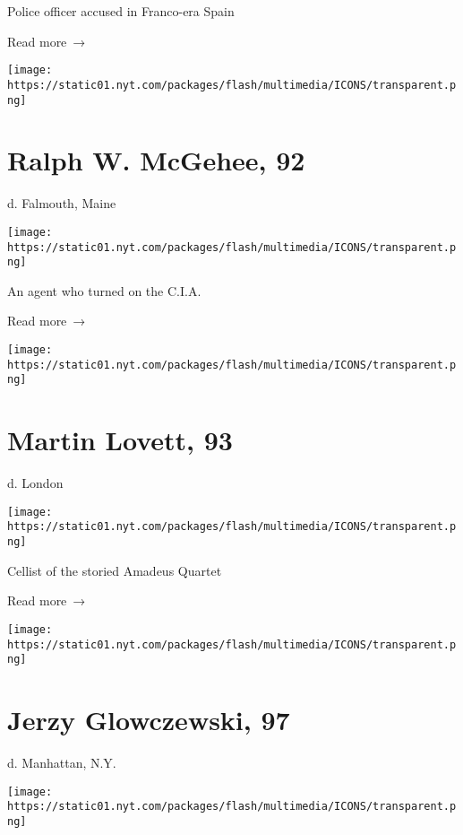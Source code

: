 Police officer accused in Franco-era Spain

 Read more~→

\href{https://www.nytimes.com/2020/05/14/us/ralph-w-mcgehee-virus-lost.html}{}

\texttt{[image: https://static01.nyt.com/packages/flash/multimedia/ICONS/transparent.png]}

\hypertarget{ralph-w-mcgehee-92}{%
\section{Ralph W. McGehee, 92}\label{ralph-w-mcgehee-92}}

d. Falmouth, Maine

\texttt{[image: https://static01.nyt.com/packages/flash/multimedia/ICONS/transparent.png]}

An agent who turned on the C.I.A.

 Read more~→

\href{https://www.nytimes.com/2020/05/14/obituaries/martin-lovett-dead-coronavirus.html}{}

\texttt{[image: https://static01.nyt.com/packages/flash/multimedia/ICONS/transparent.png]}

\hypertarget{martin-lovett-93}{%
\section{Martin Lovett, 93}\label{martin-lovett-93}}

d. London

\texttt{[image: https://static01.nyt.com/packages/flash/multimedia/ICONS/transparent.png]}

Cellist of the storied Amadeus Quartet

 Read more~→

\href{https://www.nytimes.com/2020/05/14/obituaries/jerzy-glowczewski-dead-coronavirus.html}{}

\texttt{[image: https://static01.nyt.com/packages/flash/multimedia/ICONS/transparent.png]}

\hypertarget{jerzy-glowczewski-97}{%
\section{Jerzy Glowczewski, 97}\label{jerzy-glowczewski-97}}

d. Manhattan, N.Y.

\texttt{[image: https://static01.nyt.com/packages/flash/multimedia/ICONS/transparent.png]}

